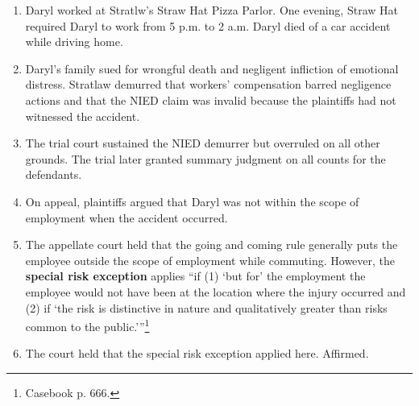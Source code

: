 \begin{enumerate}
    \item Daryl worked at Stratlw's Straw Hat Pizza Parlor. One evening, Straw 
    Hat required Daryl to work from 5 p.m. to 2 a.m. Daryl died of a car 
    accident while driving home.
    \item Daryl's family sued for wrongful death and negligent infliction of 
    emotional distress. Stratlaw demurred that workers' compensation barred 
    negligence actions and that the NIED claim was invalid because the 
    plaintiffs had not witnessed the accident.
    \item The trial court sustained the NIED demurrer but overruled on all 
    other grounds. The trial later granted summary judgment on all counts for 
    the defendants.
    \item On appeal, plaintiffs argued that Daryl was not within the scope of 
    employment when the accident occurred.
    \item The appellate court held that the going and coming rule generally 
    puts the employee outside the scope of employment while commuting. 
    However, the \textbf{special risk exception} applies ``if (1) `but for' 
    the employment the employee would not have been at the location where the 
    injury occurred and (2) if `the risk is distinctive in nature and 
    qualitatively greater than risks common to the 
    public.'''\footnote{Casebook p. 666.}
    \item The court held that the special risk exception applied here. 
    Affirmed.
\end{enumerate}
